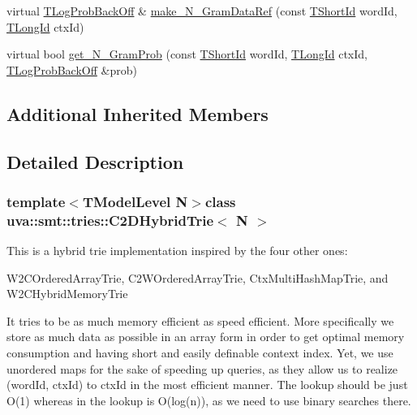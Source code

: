 \begin{DoxyCompactItemize}
\item 
virtual \hyperlink{namespaceuva_1_1smt_1_1tries_acd0660255dd9ef5d644f01de49102750}{T\+Log\+Prob\+Back\+Off} \& \hyperlink{classuva_1_1smt_1_1tries_1_1_c2_d_hybrid_trie_aca94a6b4375ee7790f6603a77c44353f}{make\+\_\+\+N\+\_\+\+Gram\+Data\+Ref} (const \hyperlink{namespaceuva_1_1smt_1_1hashing_adcf22e1982ad09d3a63494c006267469}{T\+Short\+Id} word\+Id, \hyperlink{namespaceuva_1_1smt_1_1hashing_a5992ac0dea0fb3226fb403ede09fad55}{T\+Long\+Id} ctx\+Id)
\item 
virtual bool \hyperlink{classuva_1_1smt_1_1tries_1_1_c2_d_hybrid_trie_af708e86b28e2b02e0c95c80c2ebf267e}{get\+\_\+\+N\+\_\+\+Gram\+Prob} (const \hyperlink{namespaceuva_1_1smt_1_1hashing_adcf22e1982ad09d3a63494c006267469}{T\+Short\+Id} word\+Id, \hyperlink{namespaceuva_1_1smt_1_1hashing_a5992ac0dea0fb3226fb403ede09fad55}{T\+Long\+Id} ctx\+Id, \hyperlink{namespaceuva_1_1smt_1_1tries_acd0660255dd9ef5d644f01de49102750}{T\+Log\+Prob\+Back\+Off} \&prob)
\end{DoxyCompactItemize}
\subsection*{Additional Inherited Members}


\subsection{Detailed Description}
\subsubsection*{template$<$T\+Model\+Level N$>$class uva\+::smt\+::tries\+::\+C2\+D\+Hybrid\+Trie$<$ N $>$}

This is a hybrid trie implementation inspired by the four other ones\+:

W2\+C\+Ordered\+Array\+Trie, C2\+W\+Ordered\+Array\+Trie, Ctx\+Multi\+Hash\+Map\+Trie, and W2\+C\+Hybrid\+Memory\+Trie

It tries to be as much memory efficient as speed efficient. More specifically we store as much data as possible in an array form in order to get optimal memory consumption and having short and easily definable context index. Yet, we use unordered maps for the sake of speeding up queries, as they allow us to realize (word\+Id, ctx\+Id) to ctx\+Id in the most efficient manner. The lookup should be just O(1) whereas in the lookup is O(log(n)), as we need to use binary searches there. 

